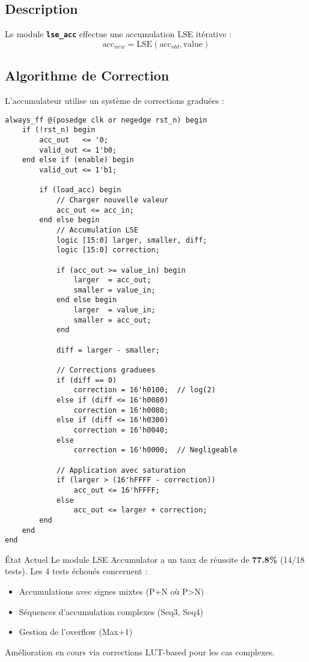 \documentclass[12pt,a4paper]{article}
\newcommand{\module}[1]{\textbf{\texttt{#1}}}
\begin{document}
\subsection{Description}

Le module \module{lse\_acc} effectue une accumulation LSE itérative :
\begin{equation}
\text{acc}_{new} = \text{LSE}(\text{acc}_{old}, \text{value})
\end{equation}

\subsection{Algorithme de Correction}

L'accumulateur utilise un système de corrections graduées :

\begin{lstlisting}[style=verilog, caption={Logique de correction de l'accumulateur}]
always_ff @(posedge clk or negedge rst_n) begin
    if (!rst_n) begin
        acc_out   <= '0;
        valid_out <= 1'b0;
    end else if (enable) begin
        valid_out <= 1'b1;
        
        if (load_acc) begin
            // Charger nouvelle valeur
            acc_out <= acc_in;
        end else begin
            // Accumulation LSE
            logic [15:0] larger, smaller, diff;
            logic [15:0] correction;
            
            if (acc_out >= value_in) begin
                larger  = acc_out;
                smaller = value_in;
            end else begin
                larger  = value_in;
                smaller = acc_out;
            end
            
            diff = larger - smaller;
            
            // Corrections graduees
            if (diff == 0)
                correction = 16'h0100;  // log(2)
            else if (diff <= 16'h0080)
                correction = 16'h0080;
            else if (diff <= 16'h0300)
                correction = 16'h0040;
            else
                correction = 16'h0000;  // Negligeable
            
            // Application avec saturation
            if (larger > (16'hFFFF - correction))
                acc_out <= 16'hFFFF;
            else
                acc_out <= larger + correction;
        end
    end
end
\end{lstlisting}

\begin{warnbox}{État Actuel}
Le module LSE Accumulator a un taux de réussite de \textbf{77.8\%} (14/18 tests). Les 4 tests échoués concernent :
\begin{itemize}
    \item Accumulations avec signes mixtes (P+N où P>N)
    \item Séquences d'accumulation complexes (Seq3, Seq4)
    \item Gestion de l'overflow (Max+1)
\end{itemize}
Amélioration en cours via corrections LUT-based pour les cas complexes.
\end{warnbox}
\end{document}
